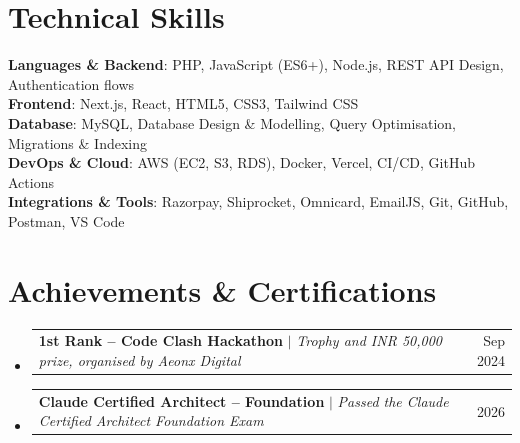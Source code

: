 \documentclass[letterpaper,11pt]{article}
\makeatletter
\newcommand{\resumeProjectHeading}[2]{
    \item
    \begin{tabular*}{0.97\textwidth}{l@{\extracolsep{\fill}}r}
      \small#1 & #2 \\
    \end{tabular*}\vspace{-7pt}
}
\newcommand{\resumeSubHeadingListStart}{\begin{itemize}[leftmargin=0.15in, label={}]}
\newcommand{\resumeSubHeadingListEnd}{\end{itemize}}
\makeatother
\begin{document}
\section{Technical Skills}
 \begin{itemize}[leftmargin=0.15in, label={}]
    \small{\item{
     \textbf{Languages \& Backend}{: PHP, JavaScript (ES6+), Node.js, REST API Design, Authentication flows} \\
     \textbf{Frontend}{: Next.js, React, HTML5, CSS3, Tailwind CSS} \\
     \textbf{Database}{: MySQL, Database Design \& Modelling, Query Optimisation, Migrations \& Indexing} \\
     \textbf{DevOps \& Cloud}{: AWS (EC2, S3, RDS), Docker, Vercel, CI/CD, GitHub Actions} \\
     \textbf{Integrations \& Tools}{: Razorpay, Shiprocket, Omnicard, EmailJS, Git, GitHub, Postman, VS Code}
    }}
 \end{itemize}

\section{Achievements \& Certifications}
 \resumeSubHeadingListStart
    \resumeProjectHeading
      {\textbf{1st Rank -- Code Clash Hackathon} $|$ \emph{Trophy and INR 50,000 prize, organised by Aeonx Digital}}{Sep 2024}
    \resumeProjectHeading
      {\textbf{Claude Certified Architect -- Foundation} $|$ \emph{Passed the Claude Certified Architect Foundation Exam}}{2026}
 \resumeSubHeadingListEnd

\end{document}
